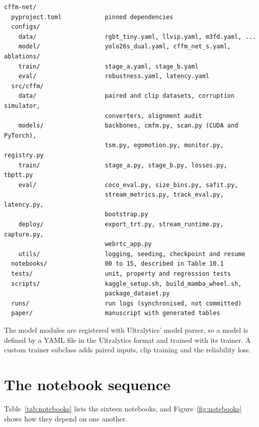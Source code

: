 \begin{Verbatim}
cffm-net/
  pyproject.toml            pinned dependencies
  configs/
    data/                   rgbt_tiny.yaml, llvip.yaml, m3fd.yaml, ...
    model/                  yolo26s_dual.yaml, cffm_net_s.yaml, ablations/
    train/                  stage_a.yaml, stage_b.yaml
    eval/                   robustness.yaml, latency.yaml
  src/cffm/
    data/                   paired and clip datasets, corruption simulator,
                            converters, alignment audit
    models/                 backbones, cmfm.py, scan.py (CUDA and PyTorch),
                            tsm.py, egomotion.py, monitor.py, registry.py
    train/                  stage_a.py, stage_b.py, losses.py, tbptt.py
    eval/                   coco_eval.py, size_bins.py, safit.py,
                            stream_metrics.py, track_eval.py, latency.py,
                            bootstrap.py
    deploy/                 export_trt.py, stream_runtime.py, capture.py,
                            webrtc_app.py
    utils/                  logging, seeding, checkpoint and resume
  notebooks/                00 to 15, described in Table 10.1
  tests/                    unit, property and regression tests
  scripts/                  kaggle_setup.sh, build_mamba_wheel.sh,
                            package_dataset.py
  runs/                     run logs (synchronised, not committed)
  paper/                    manuscript with generated tables
\end{Verbatim}

The model modules are registered with Ultralytics' model parser, so a model
is defined by a YAML file in the Ultralytics format and trained with its
trainer. A custom trainer subclass adds paired inputs, clip training and the
reliability loss.

\section{The notebook sequence}

Table~\ref{tab:notebooks} lists the sixteen notebooks, and
Figure~\ref{fig:notebooks} shows how they depend on one another.

